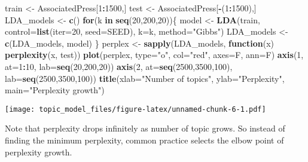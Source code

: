 \documentclass[]{article}
\newenvironment{Shaded}{\begin{snugshade}}{\end{snugshade}}
\newcommand{\ControlFlowTok}[1]{\textcolor[rgb]{0.13,0.29,0.53}{\textbf{#1}}}
\newcommand{\DataTypeTok}[1]{\textcolor[rgb]{0.13,0.29,0.53}{#1}}
\newcommand{\DecValTok}[1]{\textcolor[rgb]{0.00,0.00,0.81}{#1}}
\newcommand{\KeywordTok}[1]{\textcolor[rgb]{0.13,0.29,0.53}{\textbf{#1}}}
\newcommand{\NormalTok}[1]{#1}
\newcommand{\OperatorTok}[1]{\textcolor[rgb]{0.81,0.36,0.00}{\textbf{#1}}}
\newcommand{\StringTok}[1]{\textcolor[rgb]{0.31,0.60,0.02}{#1}}
\begin{document}
\begin{Shaded}
\begin{Highlighting}[]
\NormalTok{train <-}\StringTok{ }\NormalTok{AssociatedPress[}\DecValTok{1}\OperatorTok{:}\DecValTok{1500}\NormalTok{,]}
\NormalTok{test <-}\StringTok{ }\NormalTok{AssociatedPress[}\OperatorTok{-}\NormalTok{(}\DecValTok{1}\OperatorTok{:}\DecValTok{1500}\NormalTok{),]}
\NormalTok{LDA_models <-}\StringTok{ }\KeywordTok{c}\NormalTok{()}
\ControlFlowTok{for}\NormalTok{(k }\ControlFlowTok{in} \KeywordTok{seq}\NormalTok{(}\DecValTok{20}\NormalTok{,}\DecValTok{200}\NormalTok{,}\DecValTok{20}\NormalTok{))\{}
\NormalTok{  model <-}\StringTok{ }\KeywordTok{LDA}\NormalTok{(train, }\DataTypeTok{control=}\KeywordTok{list}\NormalTok{(}\DataTypeTok{iter=}\DecValTok{20}\NormalTok{, }\DataTypeTok{seed=}\NormalTok{SEED), }\DataTypeTok{k=}\NormalTok{k, }\DataTypeTok{method=}\StringTok{"Gibbs"}\NormalTok{)}
\NormalTok{  LDA_models <-}\StringTok{ }\KeywordTok{c}\NormalTok{(LDA_models, model)}
\NormalTok{\}}
\NormalTok{perplex <-}\StringTok{ }\KeywordTok{sapply}\NormalTok{(LDA_models, }\ControlFlowTok{function}\NormalTok{(x) }\KeywordTok{perplexity}\NormalTok{(x, test))}
\KeywordTok{plot}\NormalTok{(perplex, }\DataTypeTok{type=}\StringTok{"o"}\NormalTok{, }\DataTypeTok{col=}\StringTok{"red"}\NormalTok{, }\DataTypeTok{axes=}\NormalTok{F, }\DataTypeTok{ann=}\NormalTok{F)}
\KeywordTok{axis}\NormalTok{(}\DecValTok{1}\NormalTok{,  }\DataTypeTok{at=}\DecValTok{1}\OperatorTok{:}\DecValTok{10}\NormalTok{, }\DataTypeTok{lab=}\KeywordTok{seq}\NormalTok{(}\DecValTok{20}\NormalTok{,}\DecValTok{200}\NormalTok{,}\DecValTok{20}\NormalTok{))}
\KeywordTok{axis}\NormalTok{(}\DecValTok{2}\NormalTok{,  }\DataTypeTok{at=}\KeywordTok{seq}\NormalTok{(}\DecValTok{2500}\NormalTok{,}\DecValTok{3500}\NormalTok{,}\DecValTok{100}\NormalTok{), }\DataTypeTok{lab=}\KeywordTok{seq}\NormalTok{(}\DecValTok{2500}\NormalTok{,}\DecValTok{3500}\NormalTok{,}\DecValTok{100}\NormalTok{))}
\KeywordTok{title}\NormalTok{(}\DataTypeTok{xlab=}\StringTok{"Number of topics"}\NormalTok{, }\DataTypeTok{ylab=}\StringTok{"Perplexity"}\NormalTok{, }\DataTypeTok{main=}\StringTok{"Perplexity growth"}\NormalTok{)}
\end{Highlighting}
\end{Shaded}

\texttt{[image: topic\_model\_files/figure-latex/unnamed-chunk-6-1.pdf]}

Note that perplexity drops infinitely as number of topic grows. So
instead of finding the minimum perplexity, common practice selects the
elbow point of perplexity growth.
\end{document}

